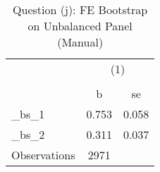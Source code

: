 \begin{table}[htbp]\centering
\def\sym#1{\ifmmode^{#1}\else\(^{#1}\)\fi}
\caption{Question (j): FE Bootstrap on Unbalanced Panel (Manual)}
\begin{tabular}{l*{1}{cc}}
\toprule
                    &\multicolumn{2}{c}{(1)}  \\
                    &\multicolumn{2}{c}{}     \\
                    &           b&          se\\
\midrule
\_bs\_1               &       0.753&       0.058\\
\_bs\_2               &       0.311&       0.037\\
\midrule
Observations        &        2971&            \\
\bottomrule
\end{tabular}
\end{table}
